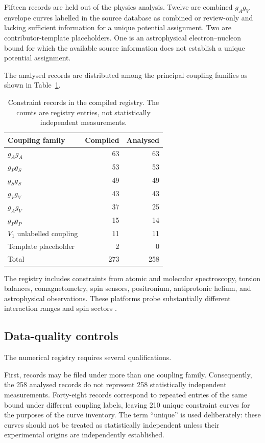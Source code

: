 \documentclass[aps,prd,reprint,superscriptaddress,nofootinbib]{revtex4-2}
\begin{document}
	Fifteen records are held out of the physics analysis. Twelve are
	combined $g_Ag_V$ envelope curves labelled in the source database as
	combined or review-only and lacking sufficient information for a unique
	potential assignment. Two are contributor-template placeholders. One
	is an astrophysical electron--nucleon bound for which the available
	source information does not establish a unique potential assignment.
	
	The analysed records are distributed among the principal coupling
	families as shown in Table~\ref{tab:families}.
	
	\begin{table}[t]
		\caption{Constraint records in the compiled registry. The counts are
			registry entries, not statistically independent measurements.}
		\label{tab:families}
		\begin{ruledtabular}
			\begin{tabular}{lrr}
				Coupling family & Compiled & Analysed\\
				\hline
				$g_Ag_A$ & 63 & 63\\
				$g_Pg_S$ & 53 & 53\\
				$g_Sg_S$ & 49 & 49\\
				$g_Vg_V$ & 43 & 43\\
				$g_Ag_V$ & 37 & 25\\
				$g_Pg_P$ & 15 & 14\\
				$V_1$ unlabelled coupling & 11 & 11\\
				Template placeholder & 2 & 0\\
				\hline
				Total & 273 & 258
			\end{tabular}
		\end{ruledtabular}
	\end{table}
	
	The registry includes constraints from atomic and molecular
	spectroscopy, torsion balances, comagnetometry, spin sensors,
	positronium, antiprotonic helium, and astrophysical observations.
	These platforms probe substantially different interaction ranges and
	spin sectors \cite{Ficek2018,Adkins2022,Liang2023,Jiang2024,
		Cong2025,WuYan2026}.
	
	\subsection{Data-quality controls}
	
	The numerical registry requires several qualifications.
	
	First, records may be filed under more than one coupling family.
	Consequently, the 258 analysed records do not represent 258
	statistically independent measurements. Forty-eight records correspond
	to repeated entries of the same bound under different coupling labels,
	leaving 210 unique constraint curves for the purposes of the curve
	inventory. The term ``unique'' is used deliberately: these curves
	should not be treated as statistically independent unless their
	experimental origins are independently established.
	
\end{document}
